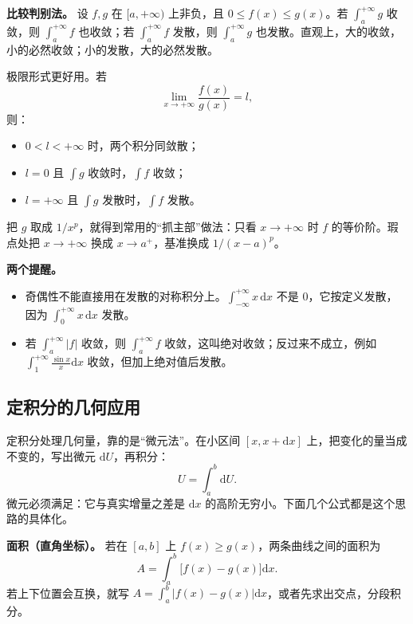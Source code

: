 \noindent\textbf{比较判别法。} 设 \(f,g\) 在 \([a,+\infty)\) 上非负，且 \(0\le f(x)\le g(x)\)。若 \(\int_a^{+\infty}g\) 收敛，则 \(\int_a^{+\infty}f\) 也收敛；若 \(\int_a^{+\infty}f\) 发散，则 \(\int_a^{+\infty}g\) 也发散。直观上，大的收敛，小的必然收敛；小的发散，大的必然发散。

极限形式更好用。若
\[
  \lim_{x\to+\infty}\frac{f(x)}{g(x)}=l,
\]
则：
\begin{itemize}
  \item \(0<l<+\infty\) 时，两个积分同敛散；
  \item \(l=0\) 且 \(\int g\) 收敛时，\(\int f\) 收敛；
  \item \(l=+\infty\) 且 \(\int g\) 发散时，\(\int f\) 发散。
\end{itemize}
把 \(g\) 取成 \(1/x^p\)，就得到常用的“抓主部”做法：只看 \(x\to+\infty\) 时 \(f\) 的等价阶。瑕点处把 \(x\to+\infty\) 换成 \(x\to a^+\)，基准换成 \(1/(x-a)^p\)。

\noindent\textbf{两个提醒。}
\begin{itemize}
  \item 奇偶性不能直接用在发散的对称积分上。\(\int_{-\infty}^{+\infty}x\,\mathrm{d}x\) 不是 \(0\)，它按定义发散，因为 \(\int_0^{+\infty}x\,\mathrm{d}x\) 发散。
  \item 若 \(\int_a^{+\infty}|f|\) 收敛，则 \(\int_a^{+\infty}f\) 收敛，这叫绝对收敛；反过来不成立，例如 \(\int_1^{+\infty}\frac{\sin x}{x}\mathrm{d}x\) 收敛，但加上绝对值后发散。
\end{itemize}

\subsection{定积分的几何应用}

定积分处理几何量，靠的是“微元法”。在小区间 \([x,x+\mathrm{d}x]\) 上，把变化的量当成不变的，写出微元 \(\mathrm{d}U\)，再积分：
\[
  U=\int_a^b \mathrm{d}U .
\]
微元必须满足：它与真实增量之差是 \(\mathrm{d}x\) 的高阶无穷小。下面几个公式都是这个思路的具体化。

\noindent\textbf{面积（直角坐标）。} 若在 \([a,b]\) 上 \(f(x)\ge g(x)\)，两条曲线之间的面积为
\[
  A=\int_a^b\bigl[f(x)-g(x)\bigr]\mathrm{d}x .
\]
若上下位置会互换，就写 \(A=\int_a^b|f(x)-g(x)|\mathrm{d}x\)，或者先求出交点，分段积分。

